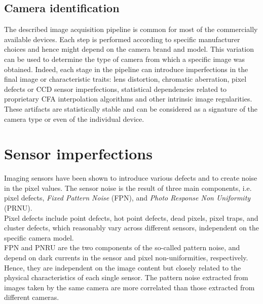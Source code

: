 \documentclass[a4paper, 12pt]{article}
\begin{document}
\subsection*{Camera identification}
The described image acquisition pipeline is common for most of the commercially
available devices. Each step is performed according to specific manufacturer
choices and hence might depend on the camera brand and model. This variation can be
used to determine the type of camera from which a specific image was obtained. Indeed,
each stage in the pipeline can introduce imperfections in the final image or characteristic
traits: lens distortion, chromatic aberration, pixel defects or CCD sensor imperfections,
statistical dependencies related to proprietary CFA interpolation algorithms and other
intrinsic image regularities. These artifacts are statistically
stable and can be considered as a signature of the camera type or even of the individual
device.

\section*{Sensor imperfections}
Imaging sensors have been shown to introduce various defects and to create noise in the
pixel values. The sensor noise is the result of three main components, i.e. pixel defects,
\textit{Fixed Pattern Noise} (FPN), and \textit{Photo Response Non Uniformity} (PRNU).\\
Pixel defects include point defects, hot point defects, dead pixels, pixel traps, and cluster
defects, which reasonably vary across different sensors, independent on the specific camera
model.\\
FPN and PNRU are the two components of the so-called pattern noise, and depend on
dark currents in the sensor and pixel non-uniformities, respectively. Hence, they are
independent on the image content but closely related to the physical characteristics of each
single sensor. The pattern noise extracted from images taken by the same camera are more
correlated than those extracted from different cameras.
\end{document}
